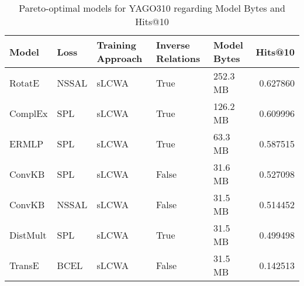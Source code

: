 \begin{table}
\centering
\caption{Pareto-optimal models for YAGO310 regarding Model Bytes and Hits@10}
\begin{tabular}{lllllr}
\toprule
    Model &   Loss & Training Approach & Inverse Relations & Model Bytes &   Hits@10 \\
\midrule
   RotatE &  NSSAL &             sLCWA &              True &    252.3 MB &  0.627860 \\
  ComplEx &    SPL &             sLCWA &              True &    126.2 MB &  0.609996 \\
    ERMLP &    SPL &             sLCWA &              True &     63.3 MB &  0.587515 \\
   ConvKB &    SPL &             sLCWA &             False &     31.6 MB &  0.527098 \\
   ConvKB &  NSSAL &             sLCWA &             False &     31.5 MB &  0.514452 \\
 DistMult &    SPL &             sLCWA &              True &     31.5 MB &  0.499498 \\
   TransE &   BCEL &             sLCWA &             False &     31.5 MB &  0.142513 \\
\bottomrule
\end{tabular}
\end{table}


